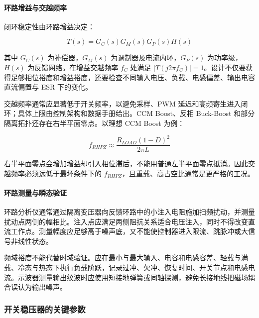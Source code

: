 \paragraph{环路增益与交越频率}

闭环稳定性由环路增益决定：

\begin{equation}
T(s)=G_C(s)G_M(s)G_P(s)H(s)
\label{eq:regulator-loop-gain}
\end{equation}

其中 $G_C(s)$ 为补偿器，$G_M(s)$ 为调制器及电流内环，$G_P(s)$ 为功率级，$H(s)$ 为反馈网络。在增益交越频率 $f_C$ 处满足 $|T(j2\pi f_C)|=1$。设计不仅要获得足够相位裕度和增益裕度，还要检查不同输入电压、负载、电感偏差、输出电容直流偏置与 ESR 下的变化。

交越频率通常应显著低于开关频率，以避免采样、PWM 延迟和高频寄生进入闭环；具体上限由控制架构和数据手册给出。CCM Boost、反相 Buck-Boost 和部分隔离拓扑还存在右半平面零点。以理想 CCM Boost 为例：

\begin{equation}
f_{RHPZ}\approx\frac{R_{LOAD}(1-D)^2}{2\pi L}
\label{eq:boost-rhp-zero}
\end{equation}

右半平面零点会增加增益却引入相位滞后，不能用普通左半平面零点抵消。因此交越频率必须远低于最坏条件下的 $f_{RHPZ}$，且重载、高占空比通常是更严格的工况。

\paragraph{环路测量与瞬态验证}

环路分析仪通常通过隔离变压器向反馈环路中的小注入电阻施加扫频扰动，并测量扰动点两侧的幅相比。注入点应满足两侧阻抗关系适合电压注入，同时不得改变直流工作点。测量幅度应足够高于噪声底，又不能使控制器进入限流、跳脉冲或大信号非线性状态。

频域裕度不能代替时域验证。应在最小与最大输入、电容和电感容差、轻载与满载、冷态与热态下执行负载阶跃，记录过冲、欠冲、恢复时间、开关节点和电感电流。示波器测量输出纹波时应使用短接地弹簧或同轴探测，避免长接地线把磁场耦合误认为输出噪声。

\subsubsection{开关稳压器的关键参数}

